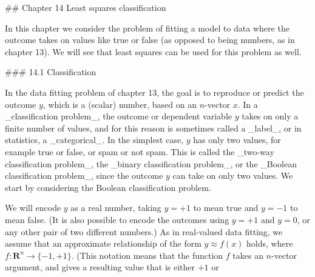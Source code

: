 

## Chapter 14 Least squares classification

In this chapter we consider the problem of fitting a model to data where the outcome takes on values like true or false (as opposed to being numbers, as in chapter 13). We will see that least squares can be used for this problem as well.

### 14.1 Classification

In the data fitting problem of chapter 13, the goal is to reproduce or predict the outcome \(y\), which is a (scalar) number, based on an \(n\)-vector \(x\). In a _classification problem_, the outcome or dependent variable \(y\) takes on only a finite number of values, and for this reason is sometimes called a _label_, or in statistics, a _categorical_. In the simplest case, \(y\) has only two values, for example true or false, or spam or not spam. This is called the _two-way classification problem_, the _binary classification problem_, or the _Boolean classification problem_, since the outcome \(y\) can take on only two values. We start by considering the Boolean classification problem.

We will encode \(y\) as a real number, taking \(y=+1\) to mean true and \(y=-1\) to mean false. (It is also possible to encode the outcomes using \(y=+1\) and \(y=0\), or any other pair of two different numbers.) As in real-valued data fitting, we assume that an approximate relationship of the form \(y\approx f(x)\) holds, where \(f:\mathbf{R}^{n}\rightarrow\{-1,+1\}\). (This notation means that the function \(f\) takes an \(n\)-vector argument, and gives a resulting value that is either \(+1\) or